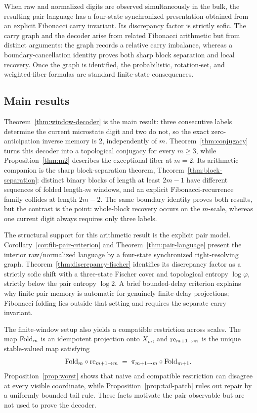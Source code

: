 When raw and normalized digits are observed simultaneously in the bulk, the resulting pair language has a four-state synchronized presentation obtained from an explicit Fibonacci carry invariant. Its discrepancy factor is strictly sofic. The carry graph and the decoder arise from related Fibonacci arithmetic but from distinct arguments: the graph records a relative carry imbalance, whereas a boundary-cancellation identity proves both sharp block separation and local recovery. Once the graph is identified, the probabilistic, rotation-set, and weighted-fiber formulas are standard finite-state consequences.

\subsection{Main results}

Theorem~\ref{thm:window-decoder} is the main result: three consecutive labels determine the current microstate digit and two do not, so the exact zero-anticipation inverse memory is \(2\), independently of \(m\). Theorem~\ref{thm:conjugacy} turns this decoder into a topological conjugacy for every \(m\ge3\), while Proposition~\ref{thm:m2} describes the exceptional fiber at \(m=2\). Its arithmetic companion is the sharp block-separation theorem, Theorem~\ref{thm:block-separation}: distinct binary blocks of length at least \(2m-1\) have different sequences of folded length-\(m\) windows, and an explicit Fibonacci-recurrence family collides at length \(2m-2\). The same boundary identity proves both results, but the contrast is the point: whole-block recovery occurs on the \(m\)-scale, whereas one current digit always requires only three labels.

The structural support for this arithmetic result is the explicit pair model. Corollary~\ref{cor:fib-pair-criterion} and Theorem~\ref{thm:pair-language} present the interior raw/normalized language by a four-state synchronized right-resolving graph. Theorem~\ref{thm:discrepancy-fischer} identifies its discrepancy factor as a strictly sofic shift with a three-state Fischer cover and topological entropy \(\log\varphi\), strictly below the pair entropy \(\log2\). A brief bounded-delay criterion explains why finite pair memory is automatic for genuinely finite-delay projections; Fibonacci folding lies outside that setting and requires the separate carry invariant.

The finite-window setup also yields a compatible restriction across scales. The map \(\mathrm{Fold}_m\) is an idempotent projection onto \(X_m\), and \(\mathrm{re}_{m+1\to m}\) is the unique stable-valued map satisfying
\[
\mathrm{Fold}_m\circ \mathrm{re}_{m+1\to m}
\;=\;
\pi_{m+1\to m}\circ \mathrm{Fold}_{m+1}.
\]
Proposition~\ref{prop:worst} shows that naive and compatible restriction can disagree at every visible coordinate, while Proposition~\ref{prop:tail-patch} rules out repair by a uniformly bounded tail rule. These facts motivate the pair observable but are not used to prove the decoder.

